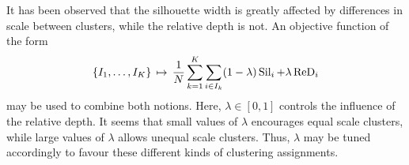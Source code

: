 It has been observed that the silhouette width is greatly affected by
differences in scale between clusters, while the relative depth is not.
An objective function of the form
\begin{equation}
    \{I_1, \dots, I_K\} \,\mapsto\, \frac{1}{N} \sum_{k = 1}^K \sum_{i \in I_k} (1 - \lambda)\operatorname{Sil}_i + \lambda\operatorname{ReD}_i
\end{equation}
may be used to combine both notions.
Here, $\lambda \in [0, 1]$ controls the influence of the relative depth.
It seems that small values of $\lambda$ encourages equal scale clusters, while
large values of $\lambda$ allows unequal scale clusters.
Thus, $\lambda$ may be tuned accordingly to favour these different kinds of
clustering assignments.
